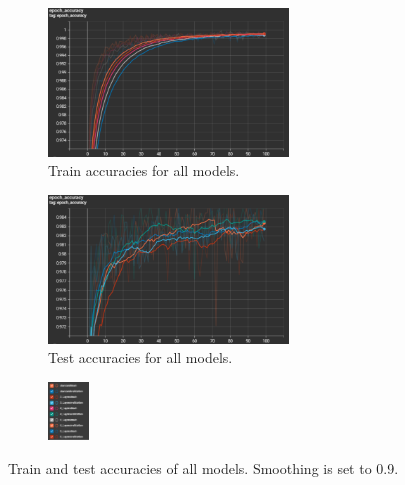 \documentclass{article}
\begin{document}
\begin{figure}[h!]
    \centering
    \begin{subfigure}[t]{\textwidth}
        \centering
        \includegraphics[width=0.7\textwidth]{./plots/screenshot3.png}
        \caption{Train accuracies for all models.}
        \label{fig:subfig8a}
    \end{subfigure}
    \vspace{0.2cm}
    \begin{subfigure}[t]{\textwidth}
        \centering
        \includegraphics[width=0.7\textwidth]{./plots/screenshot4.png}
        \caption{Test accuracies for all models.}
        \label{fig:subfig8b}
    \end{subfigure}
    \vspace{0.2cm}
    \begin{subfigure}[t]{\textwidth}
        \centering
        \includegraphics[width=0.12\textwidth]{./plots/screenshot5.png}
        \label{fig:subfig8c}
    \end{subfigure}
    \caption{Train and test accuracies of all models. Smoothing is set to 0.9.}
    \label{fig:plot8}
\end{figure}
\end{document}
